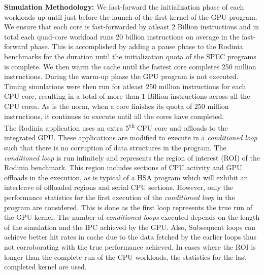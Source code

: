 \par \textbf{Simulation Methodology:} We fast-forward the initialization phase of each workloads up until just before the launch of the first kernel of the GPU program. We ensure that each core is fast-forwarded by atleast 2 Billion instructions and in total each quad-core workload runs 20 billion instructions on average in the fast-forward phase. This is accomplished by adding a pause phase to the Rodinia benchmarks for the duration until the initialization quota of the SPEC programs is complete. We then warm the cache until the fastest core completes 250 million instructions. During the warm-up phase the GPU program is not executed. Timing simulations were then run for atleast 250 million instructions for each CPU core, resulting in a total of more than 1 Billion instructions across all the CPU cores. As is the norm, when a core finishes its quota of 250 million instructions, it continues to execute until all the cores have completed. \\
The Rodinia application uses an extra 5\textsuperscript{th} CPU core and offloads to the integrated GPU. These applications are modified to execute in a \textit{conditioned loop} such that there is no corruption of data structures in the program. The \textit{conditioned loop} is run infinitely and represents the region of interest (ROI) of the Rodinia benchmark. This region includes sections of CPU activity and GPU offloads in the execution, as is typical of a HSA program which will exhibit an interleave of offloaded regions and serial CPU sections. However, only the performance statistics for the first execution of the \textit{conditioned loop} in the program are considered. 
This is done as the first loop represents the true run of the GPU kernel. The number of \textit{conditioned loops} executed depends on the length of the simulation and the IPC achieved by the GPU. Also, Subsequent loops can achieve better hit rates in cache due to the data fetched by the earlier loops thus not corroborating with the true performance achieved.
In cases where the ROI is longer than the complete run of the CPU workloads, the statistics for the last completed kernel are used. 

